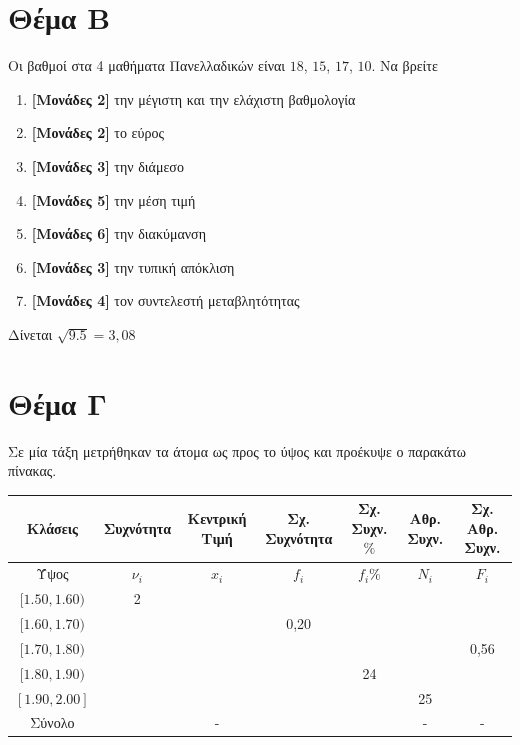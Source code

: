 \documentclass[12pt]{article}
\begin{document}
\section*{Θέμα Β}
  \noindent
Οι βαθμοί στα 4 μαθήματα Πανελλαδικών είναι $18$, $15$, $17$, $10$. Να βρείτε
  \begin{enumerate}
    \item \textbf{[Μονάδες 2]} την μέγιστη και την ελάχιστη βαθμολογία
    \item \textbf{[Μονάδες 2]} το εύρος
    \item \textbf{[Μονάδες 3]} την διάμεσο
    \item \textbf{[Μονάδες 5]} την μέση τιμή
    \item \textbf{[Μονάδες 6]} την διακύμανση
    \item \textbf{[Μονάδες 3]} την τυπική απόκλιση
    \item \textbf{[Μονάδες 4]} τον συντελεστή μεταβλητότητας
  \end{enumerate}
Δίνεται $\sqrt{9.5}=3,08$

\section*{Θέμα Γ}
  \noindent

Σε μία τάξη μετρήθηκαν τα άτομα ως προς το ύψος και προέκυψε ο παρακάτω πίνακας.
\begin{center}
\begin{tabular}{| c | c | c | c | c | c | c |} \hline
  Κλάσεις & Συχνότητα & Κεντρική Τιμή & Σχ. Συχνότητα & Σχ. Συχν. $\%$ &  Αθρ. Συχν. & Σχ. Αθρ. Συχν.\\ \hline
  Ύψος & $ν_i$ & $x_i$ & $f_i$ & $f_i\%$ & $Ν_i$ & $F_i$ \\ \hline
  $[1.50, 1.60)$ & 2 &   &      &    &    &  \\ \hline
  $[1.60, 1.70)$ &   &   & 0,20 &    &    &  \\ \hline
  $[1.70, 1.80)$ &   &   &      &    &    & 0,56 \\ \hline
  $[1.80, 1.90)$ &   &   &      & 24 &    &  \\ \hline
  $[1.90, 2.00]$ &   &   &      &    & 25 &  \\ \hline
  Σύνολο &  & - & &  & - & - \\ \hline
\end{tabular}
\end{center}
\end{document}
